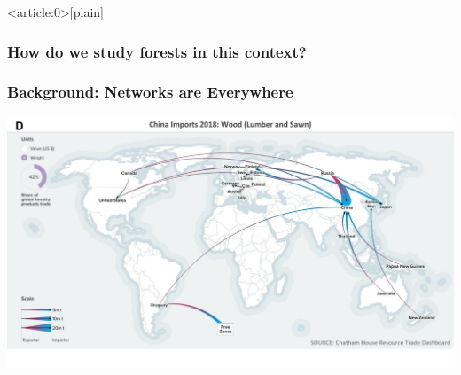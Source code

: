 { %
    \begin{frame}<article:0>[plain]
     \end{frame}
}


\begin{frame}
  \frametitle{How do we study forests in this context?}


\end{frame}


\begin{frame}
  \frametitle{Background: Networks are Everywhere}


\begin{center}\includegraphics[width=0.5\linewidth]{images/resourcetrade_network} \end{center}

\end{frame}


